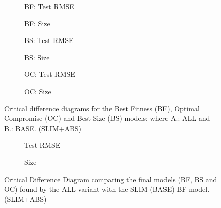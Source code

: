 \documentclass[11pt]{article}
\begin{document}
\begin{figure}[t]
\centering
\begin{subfigure}{0.48\textwidth}
\centering
\resizebox{\linewidth}{!}{}
\caption{BF: Test RMSE}
\end{subfigure}
\hfill
\begin{subfigure}{0.48\textwidth}
\centering
\resizebox{\linewidth}{!}{}
\caption{BF: Size}
\end{subfigure}
\vspace{1.5em}
\begin{subfigure}{0.48\textwidth}
\centering
\resizebox{\linewidth}{!}{}
\caption{BS: Test RMSE}
\end{subfigure}
\hfill
\begin{subfigure}{0.48\textwidth}
\centering
\resizebox{\linewidth}{!}{}
\caption{BS: Size}
\end{subfigure}
\vspace{1.5em}
\begin{subfigure}{0.48\textwidth}
\centering
\resizebox{\linewidth}{!}{}
\caption{OC: Test RMSE}
\end{subfigure}
\hfill
\begin{subfigure}{0.48\textwidth}
\centering
\resizebox{\linewidth}{!}{}
\caption{OC: Size}
\end{subfigure}
\caption{Critical difference diagrams for the Best Fitness (BF), Optimal Compromise (OC) and Best Size (BS) models; where A.: ALL and B.: BASE. (SLIM+ABS)}
\end{figure}

\begin{figure}[t]
\centering
\begin{subfigure}{0.48\textwidth}
\centering
\resizebox{\linewidth}{!}{}
\caption{Test RMSE}
\end{subfigure}
\hfill
\begin{subfigure}{0.48\textwidth}
\centering
\resizebox{\linewidth}{!}{}
\caption{Size}
\end{subfigure}
\caption{Critical Difference Diagram comparing the final models (BF, BS and OC) found by the ALL variant with the SLIM (BASE) BF model. (SLIM+ABS)}
\end{figure}
\end{document}
